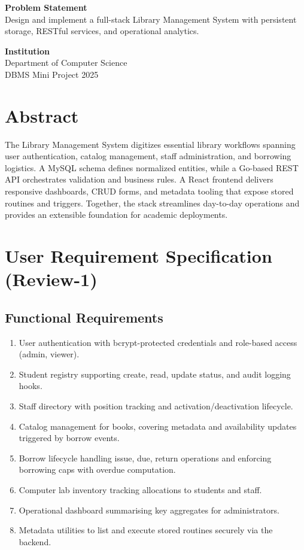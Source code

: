 \documentclass[12pt]{article}
\author{Karan M\\Department of Computer Science\\\texttt{karanm6505@gmail.com} \and
        Adithya Shetty\\Department of Computer Science\\\texttt{adithyas1204@gmail.com}}
\date{28~October~2025}
\begin{document}
\maketitle
\thispagestyle{empty}

\begin{center}
\vspace{1cm}
\textbf{Problem Statement}\\[0.5\baselineskip]
Design and implement a full-stack Library Management System with persistent storage, RESTful services, and operational analytics.

\vspace{1cm}
\textbf{Institution}\\[0.5\baselineskip]
Department of Computer Science \\DBMS Mini Project 2025
\end{center}

\newpage
\tableofcontents
\newpage

\section{Abstract}
The Library Management System digitizes essential library workflows spanning user authentication, catalog management, staff administration, and borrowing logistics. A MySQL schema defines normalized entities, while a Go-based REST API orchestrates validation and business rules. A React frontend delivers responsive dashboards, CRUD forms, and metadata tooling that expose stored routines and triggers. Together, the stack streamlines day-to-day operations and provides an extensible foundation for academic deployments.

\section{User Requirement Specification (Review-1)}
\subsection{Functional Requirements}
\begin{enumerate}[label=F\arabic*]
  \item User authentication with bcrypt-protected credentials and role-based access (admin, viewer).
  \item Student registry supporting create, read, update status, and audit logging hooks.
  \item Staff directory with position tracking and activation/deactivation lifecycle.
  \item Catalog management for books, covering metadata and availability updates triggered by borrow events.
  \item Borrow lifecycle handling issue, due, return operations and enforcing borrowing caps with overdue computation.
  \item Computer lab inventory tracking allocations to students and staff.
  \item Operational dashboard summarising key aggregates for administrators.
  \item Metadata utilities to list and execute stored routines securely via the backend.
\end{enumerate}
\end{document}

